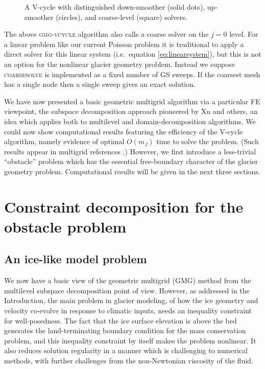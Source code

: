\documentclass[letterpaper,final,12pt,reqno]{amsart}
\theoremstyle{claim}
\numberwithin{equation}{section}
\numberwithin{figure}{section}
\numberwithin{table}{section}
\begin{document}
\begin{figure}

\caption{A V-cycle with distinguished down-smoother (solid dots), up-smoother (circles), and coarse-level (square) solvers.}
\label{fig:vcycle}
\end{figure}

The above \textsc{gmg-vcycle} algorithm also calls a coarse solver on the $j=0$ level.  For a linear problem like our current Poisson problem it is traditional to apply a direct solver for this linear system (i.e.~equation \eqref{eq:linearsystem}), but this is not an option for the nonlinear glacier geometry problem.  Instead we suppose \textsc{coarsesolve} is implemented as a fixed number of GS sweeps.  If the coarsest mesh has a single node then a single sweep gives an exact solution.

We have now presented a basic geometric multigrid algorithm via a particular FE viewpoint, the subspace decomposition approach pioneered by Xu \cite{Xu1992} and others, an idea which applies both to multilevel and domain-decomposition algorithms.  We could now show computational results featuring the efficiency of the V-cycle algorithm, namely evidence of optimal $O(m_J)$ time to solve the problem.  (Such results appear in multigrid references \cite{Briggsetal2000,Bueler2021,Elmanetal2014,Trottenbergetal2001}.)  However, we first introduce a less-trivial ``obstacle'' problem which has the essential free-boundary character of the glacier geometry problem.  Computational results will be given in the next three sections.


\section{Constraint decomposition for the obstacle problem} \label{sec:obstacle}

\subsection*{An ice-like model problem}  We now have a basic view of the geometric multigrid (GMG) method from the multilevel subspace decomposition point of view.  However, as addressed in the Introduction, the main problem in glacier modeling, of how the ice geometry and velocity co-evolve in response to climatic inputs, needs an inequality constraint for well-posedness.  The fact that the ice surface elevation is above the bed generates the land-terminating boundary condition for the mass conservation problem, and this inequality constraint by itself makes the problem nonlinear.  It also reduces solution regularity in a manner which is challenging to numerical methods, with further challenges from the non-Newtonian viscosity of the fluid.
\end{document}
